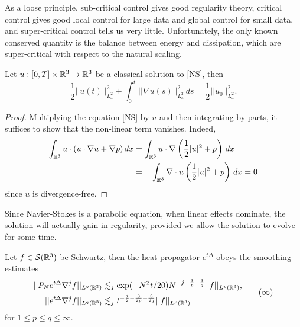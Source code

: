 As a loose principle, sub-critical control gives good regularity theory, critical control gives good local control for large data and global control for small data, and super-critical control tells us very little. Unfortunately, the only known conserved quantity is the balance between energy and dissipation, which are super-critical with respect to the natural scaling. 

\begin{proposition}
	Let $u: [0, T] \times \mathbb R^3 \to \mathbb R^3$ be a classical solution to \eqref{NS}, then 
	\begin{equation}
		\frac12 ||u (t)||_{L^2_x}^2 + \int_0^t ||\nabla u (s)||_{L^2_x}^2  \, ds = \frac12 ||u_0||_{L^2_x}^2.
		\tag{$\equiv$}
		\label{eq:energy}
	\end{equation}	
\end{proposition}

\begin{proof}
	Multiplying the equation \eqref{NS} by $u$ and then integrating-by-parts, it suffices to show that the non-linear term vanishes. Indeed, 
		\begin{align*}
			\int_{\mathbb R^3} u \cdot (u \cdot \nabla u + \nabla p ) \, dx
				&= \int_{\mathbb R^3} u \cdot \nabla \left( \frac12 |u|^2 + p \right) \, dx\\
				&= - \int_{\mathbb R^3} \nabla \cdot u \left( \frac12 |u|^2 + p \right) \, dx = 0
		\end{align*}
	since $u$ is divergence-free. 	
\end{proof}

Since Navier-Stokes is a parabolic equation, when linear effects dominate, the solution will actually gain in regularity, provided we allow the solution to evolve for some time. 

\begin{proposition}
	Let $f \in \mathcal S(\mathbb R^3)$ be Schwartz, then the heat propagator $e^{t \Delta}$ obeys the smoothing estimates
		\begin{equation}
			\begin{split}
			||P_N e^{t \Delta} \nabla^j f||_{L^q (\mathbb R^3)}
				&\lesssim_j \exp(-N^2 t/20) N^{-j  - \frac{3}{p} + \frac{3}{q}} ||f||_{L^p (\mathbb R^3)},\\
			||e^{t \Delta} \nabla^j f||_{L^q (\mathbb R^3)}
				&\lesssim_j t^{-\frac{j}2 - \frac{3}{2p} + \frac{3}{2q}} ||f||_{L^p (\mathbb R^3)}
			\end{split}	
				\tag{$\infty$}
				\label{eq:smooth}	
		\end{equation}
	for $1 \leq p \leq q \leq \infty$. 	
\end{proposition}
	
